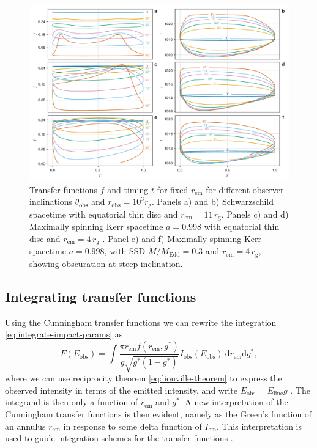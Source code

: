 \documentclass[fleqn,usenatbib]{mnras}
\renewcommand{\d}{\text{d}}
\newcommand{\rg}{r_\text{g}}
\newcommand{\rhoem}{r_\text{em}}
\begin{document}
\begin{figure}
    \centering
    \includegraphics[width=0.99\linewidth]{figures/transfer-functions.plots.pdf}
    \caption{Transfer functions $f$ and timing $t$ for fixed $\rhoem$ for
        different observer inclinations $\theta_\text{obs}$ and $r_\text{obs} =
        10^3 \rg$. Panels a) and b) Schwarzschild spacetime with equatorial thin
        disc and $\rhoem = 11\, \rg$. Panels c) and d) Maximally spinning Kerr
        spacetime $a=0.998$ with equatorial thin disc and $\rhoem = 4 \, \rg$
        \citep[see also][their Figure 1]{bambi_testing_2017}. Panel e) and f)
        Maximally spinning Kerr spacetime $a=0.998$, with SSD $\dot{M} /
        \dot{M}_\text{Edd} = 0.3$ and $\rhoem = 4\, \rg$, showing obscuration at steep
        inclination.}
    \label{fig:transfer-functions}
\end{figure}

\subsection{Integrating transfer functions}
\label{sec:transfer-function-integration}

Using the Cunningham transfer functions we can rewrite the integration
\eqref{eq:integrate-impact-params} as
\begin{equation}
    F(E_\text{obs}) = \int \frac{\pi \rhoem f(\rhoem, g^\ast)}{g \sqrt{g^\ast (1 - g^\ast)}}
    I_\text{obs}(E_\text{obs}) \ \d \rhoem \d g^\ast,
\end{equation}
where we can use reciprocity theorem \eqref{eq:liouville-theorem} to express the
observed intensity in terms of the emitted intensity, and write $E_\text{obs} =
E_\text{line}g$ . The integrand is then only a function of $\rhoem$ and
$g^\ast$. A new interpretation of the Cunningham transfer functions is then
evident, namely as the Green's function of an annulus $\rhoem$ in response to
some delta function of $I_\text{em}$. This interpretation is used to guide
integration schemes for the transfer functions \citep{dauser_broad_2010}.
\end{document}
